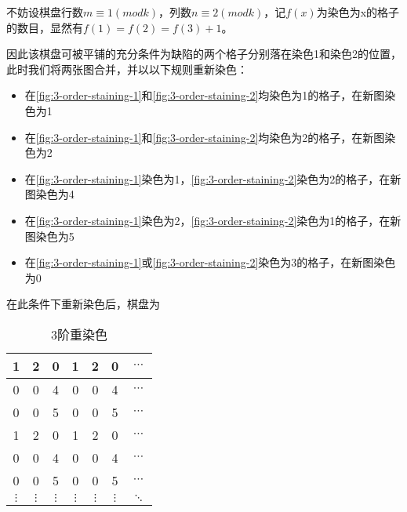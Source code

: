 不妨设棋盘行数$m \equiv 1 (mod k)$，列数$n \equiv 2 (mod k)$，记$f(x)$为染色为x的格子的数目，显然有$f(1) = f(2) = f(3) + 1$。

因此该棋盘可被平铺的充分条件为缺陷的两个格子分别落在染色1和染色2的位置，此时我们将两张图合并，并以以下规则重新染色：
\begin{itemize}
	\item 在\ref*{fig:3-order-staining-1}和\ref*{fig:3-order-staining-2}均染色为1的格子，在新图染色为1
	\item 在\ref*{fig:3-order-staining-1}和\ref*{fig:3-order-staining-2}均染色为2的格子，在新图染色为2
	\item 在\ref*{fig:3-order-staining-1}染色为1，\ref*{fig:3-order-staining-2}染色为2的格子，在新图染色为4
	\item 在\ref*{fig:3-order-staining-1}染色为2，\ref*{fig:3-order-staining-2}染色为1的格子，在新图染色为5
	\item 在\ref*{fig:3-order-staining-1}或\ref*{fig:3-order-staining-2}染色为3的格子，在新图染色为0
\end{itemize}

在此条件下重新染色后，棋盘为

\begin{table}[h]
	\centering
	\caption{3阶重染色}
	\begin{tabular}{|c|c|c|c|c|c|c|}
		\hline
		1        & 2        & 0        & 1        & 2        & 0        & $\cdots$ \\
		\hline
		0        & 0        & 4        & 0        & 0        & 4        & $\cdots$ \\
		\hline
		0        & 0        & 5        & 0        & 0        & 5        & $\cdots$ \\
		\hline
		1        & 2        & 0        & 1        & 2        & 0        & $\cdots$ \\
		\hline
		0        & 0        & 4        & 0        & 0        & 4        & $\cdots$ \\
		\hline
		0        & 0        & 5        & 0        & 0        & 5        & $\cdots$ \\
		\hline
		$\vdots$ & $\vdots$ & $\vdots$ & $\vdots$ & $\vdots$ & $\vdots$ & $\ddots$ \\
		\hline
	\end{tabular}
	\label{fig:3-order-staining-last}
\end{table}


